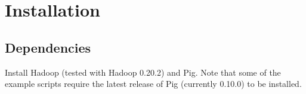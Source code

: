 
\section{Installation}



\subsection{Dependencies}
Install Hadoop (tested with Hadoop 0.20.2) and Pig. Note that some of the
example scripts require the latest release of Pig (currently 0.10.0) to
be installed.

